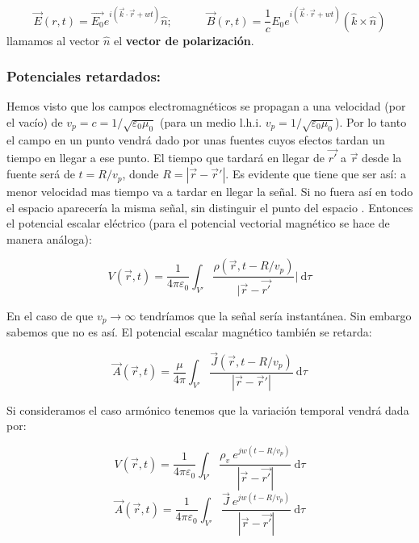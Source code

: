 \documentclass[12pt,a4paper]{article}
\newcommand{\D}{\mathrm{d}}
\newcommand{\tquad}{\quad \quad \quad}
\begin{document}
\begin{equation}
\vec{E}(r,t) = \vec{E_0} e^{i (\vec{k}\cdot \vec{r} + wt)} \widehat{n}; \tquad \vec{B}(r,t) = \dfrac{1}{c} E_0 e^{i (\vec{k} \cdot \vec{r} + wt)} (\widehat{k} \times \widehat{n})
\end{equation}
llamamos al vector $\widehat{n}$ el \textbf{vector de polarización}.

\subsubsection{Potenciales retardados:}

Hemos visto que los campos electromagnéticos se propagan a una velocidad (por el vacío) de $v_p = c = 1/\sqrt{\varepsilon_0 \mu_0}$ (para un medio l.h.i. $v_p = 1/\sqrt{\varepsilon_0 \mu_0}$). Por lo tanto el campo en un punto vendrá dado por unas fuentes cuyos efectos tardan un tiempo en llegar a ese punto.  El tiempo que tardará en llegar de $\vec{r'}$ a $\vec{r}$ desde la fuente será de $t = R/v_p$, donde $R = |\vec{r}-\vec{r}'|$. Es evidente que tiene que ser así: a menor velocidad mas tiempo va a tardar en llegar la señal. Si no fuera así en todo el espacio aparecería la misma señal, sin distinguir el punto del espacio . Entonces el potencial escalar eléctrico (para el potencial vectorial magnético se hace de manera análoga):

\begin{equation}
V(\vec{r},t) = \dfrac{1}{4 \pi \varepsilon_0} \int_{V'} \dfrac{\rho (\vec{r},t-R/v_p)}{|\vec{r}- \vec{r'}}| \ \D \tau
\end{equation}

En el caso de que $v_p \rightarrow \infty$ tendríamos que la señal sería instantánea. Sin embargo sabemos que no es así. El potencial escalar magnético también se retarda:

\begin{equation}
\vec{A} (\vec{r},t) = \dfrac{\mu}{4 \pi} \int_{V'} \dfrac{\vec{J}(\vec{r},t-R/v_p)}{|\vec{r}- \vec{r}'|} \ \D \tau
\end{equation} 

Si consideramos el caso armónico tenemos que la variación temporal vendrá dada por:

\begin{equation}
V(\vec{r},t) = \dfrac{1}{4 \pi \varepsilon_0} \int_{V'} \dfrac{\rho_v \  e^{jw(t-R/v_p)}}{|\vec{r}-\vec{r'}|} \ \D \tau
\end{equation}
\begin{equation}
\vec{A}(\vec{r},t) = \dfrac{1}{4 \pi \varepsilon_0} \int_{V'} \dfrac{\vec{J} \  e^{jw(t-R/v_p)}}{|\vec{r}-\vec{r'}|} \ \D \tau
\end{equation}
\end{document}
